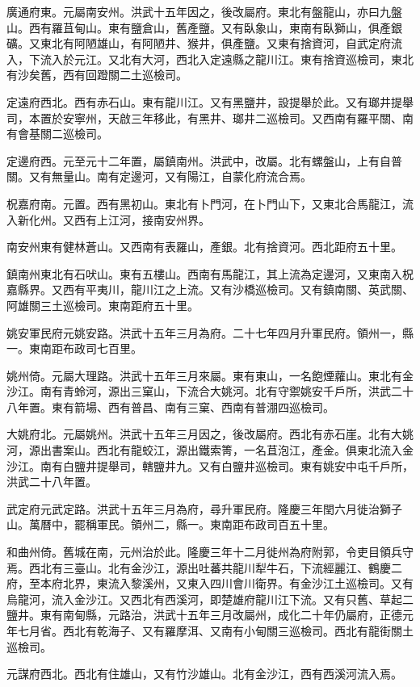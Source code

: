 廣通府東。元屬南安州。洪武十五年因之，後改屬府。東北有盤龍山，亦曰九盤山。西有羅苴甸山。東有鹽倉山，舊產鹽。又有臥象山，東南有臥獅山，俱產銀礦。又東北有阿陋雄山，有阿陋井、猴井，俱產鹽。又東有捨資河，自武定府流入，下流入於元江。又北有大河，西北入定遠縣之龍川江。東有捨資巡檢司，東北有沙矣舊，西有回蹬關二土巡檢司。

定遠府西北。西有赤石山。東有龍川江。又有黑鹽井，設提舉於此。又有瑯井提舉司，本置於安寧州，天啟三年移此，有黑井、瑯井二巡檢司。又西南有羅平關、南有會基關二巡檢司。

定邊府西。元至元十二年置，屬鎮南州。洪武中，改屬。北有螺盤山，上有自普關。又有無量山。南有定邊河，又有陽江，自蒙化府流合焉。

柷嘉府南。元置。西有黑初山。東北有卜門河，在卜門山下，又東北合馬龍江，流入新化州。又西有上江河，接南安州界。

南安州東有健林蒼山。又西南有表羅山，產銀。北有捨資河。西北距府五十里。

鎮南州東北有石吠山。東有五樓山。西南有馬龍江，其上流為定邊河，又東南入柷嘉縣界。又西有平夷川，龍川江之上流。又有沙橋巡檢司。又有鎮南關、英武關、阿雄關三土巡檢司。東南距府五十里。

姚安軍民府元姚安路。洪武十五年三月為府。二十七年四月升軍民府。領州一，縣一。東南距布政司七百里。

姚州倚。元屬大理路。洪武十五年三月來屬。東有東山，一名飽煙蘿山。東北有金沙江。南有青蛉河，源出三窠山，下流合大姚河。北有守禦姚安千戶所，洪武二十八年置。東有箭場、西有普昌、南有三窠、西南有普淜四巡檢司。

大姚府北。元屬姚州。洪武十五年三月因之，後改屬府。西北有赤石崖。北有大姚河，源出書案山。西北有龍蛟江，源出鐵索箐，一名苴泡江，產金。俱東北流入金沙江。南有白鹽井提舉司，轄鹽井九。又有白鹽井巡檢司。東有姚安中屯千戶所，洪武二十八年置。

武定府元武定路。洪武十五年三月為府，尋升軍民府。隆慶三年閏六月徙治獅子山。萬曆中，罷稱軍民。領州二，縣一。東南距布政司百五十里。

和曲州倚。舊城在南，元州治於此。隆慶三年十二月徙州為府附郭，令吏目領兵守焉。西北有三臺山。北有金沙江，源出吐蕃共龍川犁牛石，下流經麗江、鶴慶二府，至本府北界，東流入黎溪州，又東入四川會川衛界。有金沙江土巡檢司。又有烏龍河，流入金沙江。又西北有西溪河，即楚雄府龍川江下流。又有只舊、草起二鹽井。東有南甸縣，元路治，洪武十五年三月改屬州，成化二十年仍屬府，正德元年七月省。西北有乾海子、又有羅摩洱、又南有小甸關三巡檢司。西北有龍街關土巡檢司。

元謀府西北。西北有住雄山，又有竹沙雄山。北有金沙江，西有西溪河流入焉。


